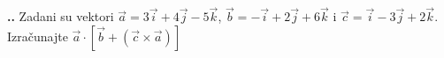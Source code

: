 
\noindent 
\textbf{
\thecjelina.\thezadatak.}
Zadani su vektori $\vec{a}=3\vec{i}+4\vec{j}-5\vec{k}$,  $\vec{b} = -\vec{i}+2\vec{j}+6\vec{k}$ i $\vec{c}=\vec{i}-3\vec{j}+2\vec{k}$. Izračunajte $\vec{a}\cdot [\vec{b}+ (\vec{c}\times \vec{a} ) ]$
